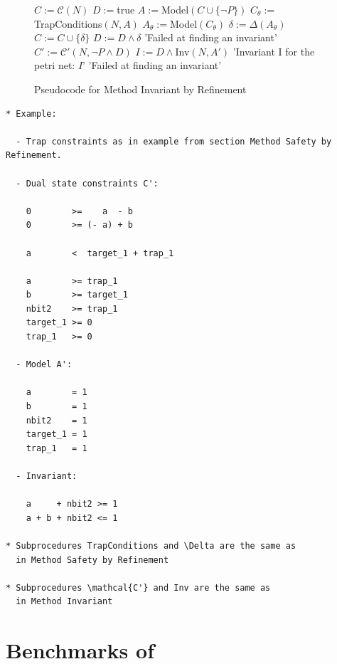 \documentclass{llncs}
\begin{document}
\begin{figure}
\begin{algorithmic}[1]
\State $C := \mathcal C(N)$
\State $D := $true
  \State $A := $Model$(C \cup \{\neg P\})$
  \State $C_\theta := $TrapConditions$(N, A)$
    \State $A_\theta := $Model$(C_\theta)$
    \State $\delta := \Delta(A_\theta)$
    \State $C := C \cup \{\delta\}$
    \State $D := D \land \delta$
  \Else
    \State \Return 'Failed at finding an invariant'
  \EndIf
\EndWhile
\State $C' := \mathcal C'(N, \neg P \land D)$
  \State $I := D \land $Inv$(N, A')$
  \State \Return 'Invariant I for the petri net: $I$'
\Else
  \State \Return 'Failed at finding an invariant'
\EndIf
\end{algorithmic}
\caption{Pseudocode for Method Invariant by Refinement}
\label{fig:method-invariant-by-refinement-pseudocode}
\end{figure}

\newpage

\begin{verbatim}
* Example:

  - Trap constraints as in example from section Method Safety by Refinement.
  
  - Dual state constraints C':

    0        >=    a  - b
    0        >= (- a) + b

    a        <  target_1 + trap_1

    a        >= trap_1
    b        >= target_1
    nbit2    >= trap_1
    target_1 >= 0
    trap_1   >= 0

  - Model A':

    a        = 1
    b        = 1
    nbit2    = 1
    target_1 = 1
    trap_1   = 1
    
  - Invariant:

    a     + nbit2 >= 1
    a + b + nbit2 <= 1

* Subprocedures TrapConditions and \Delta are the same as
  in Method Safety by Refinement

* Subprocedures \mathcal{C'} and Inv are the same as
  in Method Invariant
\end{verbatim}

\iffalse

\newpage
\section{Benchmarks of \bfc}
\end{document}

